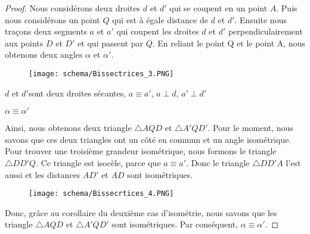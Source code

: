 \documentclass[a4paper,12pt]{article}
\begin{document}
\begin{proof}
Nous considérons deux droites $d$ et $d'$ qui se coupent en un point $A$. Puis nous considérons un point $Q$ qui est à égale distance de $d$ et $d'$. Ensuite nous traçons deux segments $a$ et $a'$ qui coupent les droites $d$ et $d'$ perpendiculairement aux points $D$ et $D'$ et qui passent par $Q$. En reliant le point Q et le point A, nous obtenons deux angles $\alpha$ et $\alpha'$.

 \begin{figure}[H]
    \centering
    \texttt{[image: schema/Bissectrices\_3.PNG]}
\end{figure}


\begin{hyp}
$d$ et $d'$sont deux droites sécantes, $a\equiv a'$, $a\perp d$, $a' \perp d'$
\end{hyp}
\begin{concl}
$\alpha \equiv \alpha'$
\end{concl}
Ainsi, nous obtenons deux triangle $\triangle AQD$ et $\triangle A'QD'$. Pour le moment, nous savons que ces deux triangles ont un côté en commun et un angle isométrique. Pour trouver une troisième grandeur isométrique, nous formons le triangle $\triangle DD'Q$. Ce triangle est isocèle, parce que $a\equiv a'$. Donc le triangle $\triangle DD'A$ l'est aussi et les distances $AD'$ et $AD$ sont isométriques. 

 \begin{figure}[H]
    \centering
    \texttt{[image: schema/Bissecrtices\_4.PNG]}
\end{figure}


Donc, grâce au corollaire du deuxième cas d'isométrie, nous savons que les triangle $\triangle AQD$ et $\triangle A'QD'$ sont isométriques. Par conséquent, $\alpha \equiv \alpha'$.
\end{proof}
\end{document}
